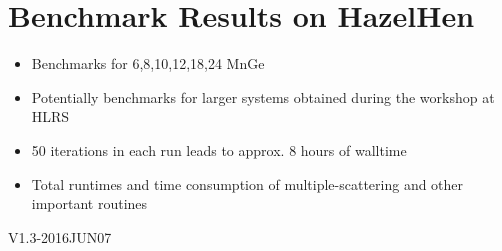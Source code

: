 \documentclass [a4paper, 12pt]{article}
\begin{document}
\section{Benchmark Results on HazelHen}

\begin{itemize}
	\item Benchmarks for 6,8,10,12,18,24 MnGe
	\item Potentially benchmarks for larger systems obtained during the workshop at HLRS
	\item 50 iterations in each run leads to approx. 8 hours of walltime
	\item Total runtimes and time consumption of multiple-scattering and other important routines
\end{itemize}

\newpage




\bigskip
\begin{flushright}
{\tiny V1.3-2016JUN07}
\end{flushright}
\end{document}
